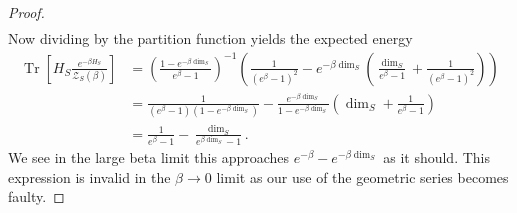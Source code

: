 \documentclass{article}
\newcommand{\parens}[1]{\left( #1 \right)}
\newcommand{\brackets}[1]{\left[ #1 \right]}
\DeclareMathOperator{\Tr}{Tr}
\newcommand{\trace}[1]{\Tr \brackets{ #1 }}
\newcommand{\partfun}{\mathcal{Z}}
\begin{document}
\begin{proof}
\begin{align}
    \end{align}
    Now dividing by the partition function yields the expected energy
    \begin{align}
        \trace{H_S \frac{e^{-\beta H_S}}{\partfun_S(\beta )}} &= \left( \frac{1 - e^{-\beta \dim_S}}{e^{\beta} - 1} \right)^{-1} \parens{\frac{1}{(e^{\beta} - 1)^2} - e^{-\beta \dim_S} \parens{\frac{\dim_S}{e^{\beta} - 1} + \frac{1}{(e^{\beta} - 1)^2}}} \\
        &= \frac{1}{(e^{\beta} - 1)(1 - e^{-\beta \dim_S} )} - \frac{e^{-\beta \dim_S}}{1 - e^{-\beta \dim_S}} \parens{\dim_S + \frac{1}{e^{\beta} - 1}} \\
        &= \frac{1}{e^{\beta} - 1} - \frac{\dim_S}{e^{\beta \dim_S} - 1}.
    \end{align}
    We see in the large beta limit this approaches $e^{-\beta} - e^{-\beta \dim_S}$ as it should. This expression is invalid in the $\beta \to 0$ limit as our use of the geometric series becomes faulty. 
\end{proof}
\end{document}
